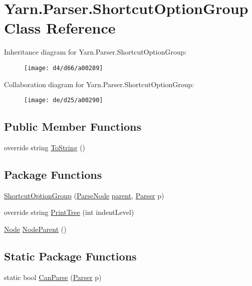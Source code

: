 \hypertarget{a00071}{\section{Yarn.\-Parser.\-Shortcut\-Option\-Group Class Reference}
\label{a00071}
}


Inheritance diagram for Yarn.\-Parser.\-Shortcut\-Option\-Group\-:
\nopagebreak
\begin{figure}[H]
\begin{center}
\leavevmode
\texttt{[image: d4/d66/a00289]}
\end{center}
\end{figure}


Collaboration diagram for Yarn.\-Parser.\-Shortcut\-Option\-Group\-:
\nopagebreak
\begin{figure}[H]
\begin{center}
\leavevmode
\texttt{[image: de/d25/a00290]}
\end{center}
\end{figure}
\subsection*{Public Member Functions}
\begin{DoxyCompactItemize}
\item 
override string \hyperlink{a00063_a18c67cb16090d0889bb9d6c8c6c565f8}{To\-String} ()
\end{DoxyCompactItemize}
\subsection*{Package Functions}
\begin{DoxyCompactItemize}
\item 
\hyperlink{a00071_aa4ee47826640ad8dff651603c940c7f4}{Shortcut\-Option\-Group} (\hyperlink{a00063}{Parse\-Node} \hyperlink{a00063_af313a82103fcc2ff5a177dbb06b92f7b}{parent}, \hyperlink{a00064}{Parser} p)
\item 
override string \hyperlink{a00071_a7b60f85e46b8767db81177ec40e83104}{Print\-Tree} (int indent\-Level)
\item 
\hyperlink{a00054}{Node} \hyperlink{a00063_a580e520a29444fc23ac3660cbe514a09}{Node\-Parent} ()
\end{DoxyCompactItemize}
\subsection*{Static Package Functions}
\begin{DoxyCompactItemize}
\item 
static bool \hyperlink{a00071_a906962aae2ecb11535f34249a34703f8}{Can\-Parse} (\hyperlink{a00064}{Parser} p)
\end{DoxyCompactItemize}
